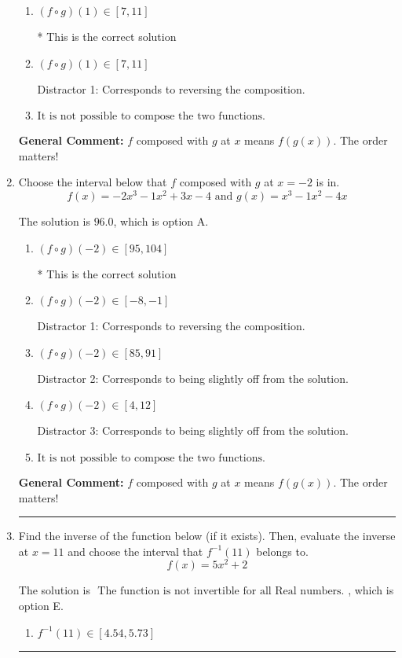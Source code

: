 \documentclass{extbook}[14pt]
\newcommand{\litem}[1]{\item #1

\rule{\textwidth}{0.4pt}}
\begin{document}
\begin{enumerate}
{\begin{enumerate}[label=\Alph*.]
 Distractor 2: Corresponds to being slightly off from the solution.
\item \( (f \circ g)(1) \in [7, 11] \)

* This is the correct solution
\item \( (f \circ g)(1) \in [7, 11] \)

 Distractor 1: Corresponds to reversing the composition.
\item \( \text{It is not possible to compose the two functions.} \)


\end{enumerate}

\textbf{General Comment:} $f$ composed with $g$ at $x$ means $f(g(x))$. The order matters!
}
\litem{
Choose the interval below that $f$ composed with $g$ at $x=-2$ is in.
\[ f(x) = -2x^{3} -1 x^{2} +3 x -4 \text{ and } g(x) = x^{3} -1 x^{2} -4 x \]

The solution is \( 96.0 \), which is option A.\begin{enumerate}[label=\Alph*.]
\item \( (f \circ g)(-2) \in [95, 104] \)

* This is the correct solution
\item \( (f \circ g)(-2) \in [-8, -1] \)

 Distractor 1: Corresponds to reversing the composition.
\item \( (f \circ g)(-2) \in [85, 91] \)

 Distractor 2: Corresponds to being slightly off from the solution.
\item \( (f \circ g)(-2) \in [4, 12] \)

 Distractor 3: Corresponds to being slightly off from the solution.
\item \( \text{It is not possible to compose the two functions.} \)


\end{enumerate}

\textbf{General Comment:} $f$ composed with $g$ at $x$ means $f(g(x))$. The order matters!
}
\litem{
Find the inverse of the function below (if it exists). Then, evaluate the inverse at $x = 11$ and choose the interval that $f^{-1}(11)$ belongs to.
\[ f(x) = 5 x^2 + 2 \]

The solution is \( \text{ The function is not invertible for all Real numbers. } \), which is option E.\begin{enumerate}[label=\Alph*.]
\item \( f^{-1}(11) \in [4.54, 5.73] \)


\end{enumerate}}
\end{enumerate}
\end{document}
